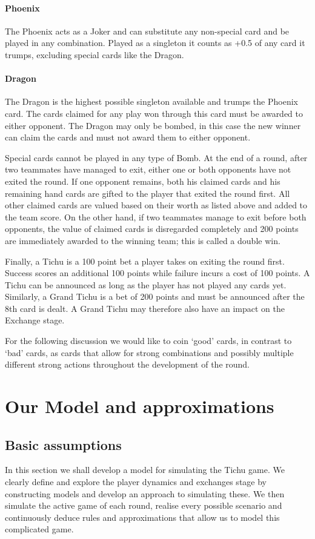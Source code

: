 \paragraph*{Phoenix}
The Phoenix acts as a Joker and can substitute any non-special card and be played in any combination. Played as a singleton it counts as +0.5 of any card it trumps, excluding special cards like the Dragon.
\paragraph{Dragon}
The Dragon is the highest possible singleton available and trumps the Phoenix card. The cards claimed for any play won through this card must be awarded to either opponent. The Dragon may only be bombed, in this case the new winner can claim the cards and must not award them to either opponent.

Special cards cannot be played in any type of Bomb. At the end of a round, after two teammates have managed to exit, either one or both opponents have not exited the round. If one opponent remains, both his claimed cards and his remaining hand cards are gifted to the player that exited the round first. All other claimed cards are valued based on their worth as listed above and added to the team score. On the other hand, if two teammates manage to exit before both opponents, the value of claimed cards is disregarded completely and 200 points are immediately awarded to the winning team; this is called a double win.

Finally, a Tichu is a 100 point bet a player takes on exiting the round first. Success scores an additional 100 points while failure incurs a cost of 100 points. A Tichu can be announced as long as the player has not played any cards yet. Similarly, a Grand Tichu is a bet of 200 points and must be announced after the 8th card is dealt. A Grand Tichu may therefore also have an impact on the Exchange stage.

For the following discussion we would like to coin ‘good’ cards, in contrast to ‘bad’ cards, as cards that allow for strong combinations and possibly multiple different strong actions throughout the development of the round.


\section{Our Model and approximations}
\subsection{Basic assumptions}
In this section we shall develop a model for simulating the Tichu game. We clearly define and explore the player dynamics and exchanges stage by constructing models and develop an approach to simulating these. We then simulate the active game of each round, realise every possible scenario and continuously deduce rules and approximations that allow us to model this complicated game.

